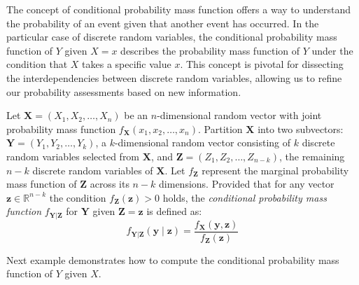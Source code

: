 The concept of conditional probability mass function offers a way to understand the probability of an event given that another event has occurred. In the particular case of discrete random variables, the conditional probability mass function of $Y$ given $X=x$ describes the probability mass function of $Y$ under the condition that $X$ takes a specific value $x$. This concept is pivotal for dissecting the interdependencies between discrete random variables, allowing us to refine our probability assessments based on new information.

\begin{definition}
\label{def:conditional_probability_function}
Let \( \mathbf{X} = (X_{1}, X_{2}, \ldots, X_{n}) \) be an \( n \)-dimensional random vector with joint probability mass function \( f_{\mathbf{X}}(x_{1}, x_{2}, \ldots, x_{n}) \). Partition \( \mathbf{X} \) into two subvectors: \( \mathbf{Y} = (Y_{1}, Y_{2}, \ldots, Y_{k}) \), a \( k \)-dimensional random vector consisting of \( k \) discrete random variables selected from \( \mathbf{X} \), and \( \mathbf{Z} = (Z_{1}, Z_{2}, \ldots, Z_{n-k}) \), the remaining \( n - k \) discrete random variables of \( \mathbf{X} \). Let \( f_{\mathbf{Z}} \) represent the marginal probability mass function of \( \mathbf{Z} \) across its \( n - k \) dimensions. Provided that for any vector \( \mathbf{z} \in \mathbb{R}^{n - k} \) the condition \( f_{\mathbf{Z}}(\mathbf{z}) > 0 \) holds, the \emph{conditional probability mass function} \( f_{\mathbf{Y}|\mathbf{Z}} \) for \( \mathbf{Y} \) given \( \mathbf{Z} = \mathbf{z} \) is defined as:
\[
f_{\mathbf{Y}|\mathbf{Z}} ( \mathbf{y} \mid \mathbf{z} ) = \frac{f_{\mathbf{X}} ( \mathbf{y}, \mathbf{z} )}{f_{\mathbf{Z}} ( \mathbf{z} )}
\]
\end{definition}

Next example demonstrates how to compute the conditional probability mass function of \( Y \) given \( X \).

